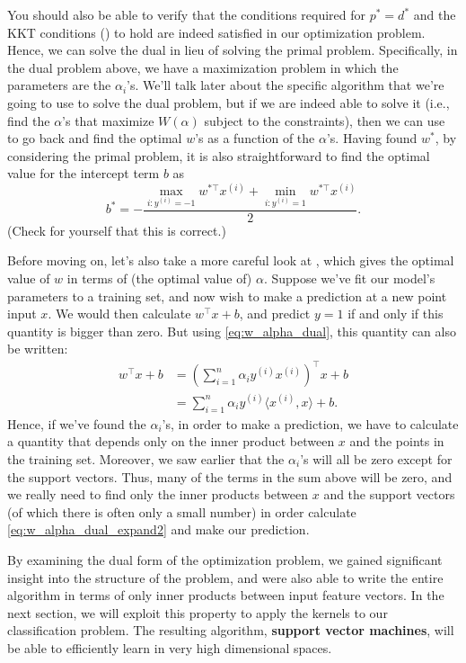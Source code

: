 You should also be able to verify that the conditions required for $p^* = d^*$
and the KKT conditions () to hold are indeed satisfied in
our optimization problem. Hence, we can solve the dual in lieu of solving
the primal problem. Specifically, in the dual problem above, we have a
maximization problem in which the parameters are the $\alpha_i$'s. We'll talk later
about the specific algorithm that we're going to use to solve the dual problem,
but if we are indeed able to solve it (i.e., find the $\alpha$'s that maximize $W(\alpha)$
subject to the constraints), then we can use  to go back and
find the optimal $w$'s as a function of the $\alpha$'s. Having found $w^*$, by considering
the primal problem, it is also straightforward to find the optimal value for
the intercept term $b$ as
\begin{equation}
    b^* = -\frac{\max_{i:y^{(i)} = -1} w^{*\top} x^{(i)} + \min_{i:y^{(i)} =1} w^{*\top}x^{(i)}}{2}\label{eq:b_optimal}.
\end{equation}
(Check for yourself that this is correct.)

Before moving on, let's also take a more careful look at ,
which gives the optimal value of $w$ in terms of (the optimal value of) $\alpha$.
Suppose we've fit our model's parameters to a training set, and now wish to
make a prediction at a new point input $x$. We would then calculate $w^\top x+b$,
and predict $y = 1$ if and only if this quantity is bigger than zero. But
using \cref{eq:w_alpha_dual}, this quantity can also be written:
\begin{align}
    w^\top x + b &= \left( \sum_{i=1}^n \alpha_i y^{(i)} x^{(i)} \right)^\top x + b\label{eq:w_alpha_dual_expand1}\\
    &= \sum_{i=1}^n \alpha_i y^{(i)} \langle x^{(i)} ,x \rangle + b\label{eq:w_alpha_dual_expand2}.
\end{align}
Hence, if we've found the $\alpha_i$'s, in order to make a prediction, we have to
calculate a quantity that depends only on the inner product between $x$ and
the points in the training set. Moreover, we saw earlier that the $\alpha_i$'s will all
be zero except for the support vectors. Thus, many of the terms in the sum
above will be zero, and we really need to find only the inner products between
$x$ and the support vectors (of which there is often only a small number) in
order calculate \cref{eq:w_alpha_dual_expand2} and make our prediction.

By examining the dual form of the optimization problem, we gained significant
insight into the structure of the problem, and were also able to write
the entire algorithm in terms of only inner products between input feature
vectors. In the next section, we will exploit this property to apply the kernels
to our classification problem. The resulting algorithm, \textbf{support vector
machines}, will be able to efficiently learn in very high dimensional spaces.

